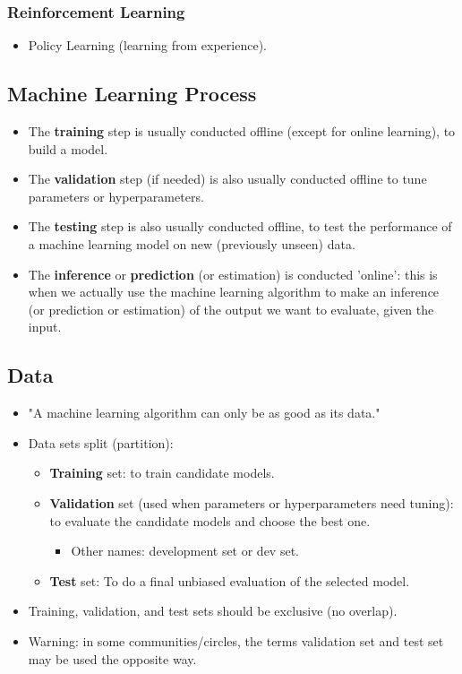 \documentclass[8pt]{article}
\begin{document}
\subsubsection*{Reinforcement Learning}
\begin{itemize}
    \item Policy Learning (learning from experience).
\end{itemize}

\subsection*{Machine Learning Process}
\begin{itemize}
    \item The \textbf{training} step is usually conducted offline (except for online learning), to build a model.
    \item The \textbf{validation} step (if needed) is also usually conducted offline to tune parameters or hyperparameters.
    \item The \textbf{testing} step is also usually conducted offline, to test the performance of a machine learning model on new (previously unseen) data.
    \item The \textbf{inference} or \textbf{prediction} (or estimation) is conducted 'online': this is when we actually use the machine learning algorithm to make an inference (or prediction or estimation) of the output we want to evaluate, given the input.
\end{itemize}

\subsection*{Data}
\begin{itemize}
    \item "A machine learning algorithm can only be as good as its data."
    \item Data sets split (partition):
    \begin{itemize}
        \item \textbf{Training} set: to train candidate models.
        \item \textbf{Validation} set (used when parameters or hyperparameters need tuning): to evaluate the candidate models and choose the best one.
        \begin{itemize}
            \item Other names: development set or dev set.
        \end{itemize}
        \item \textbf{Test} set: To do a final unbiased evaluation of the selected model.
    \end{itemize}
    \item Training, validation, and test sets should be exclusive (no overlap).
    \item Warning: in some communities/circles, the terms validation set and test set may be used the opposite way.
\end{itemize}
\end{document}
